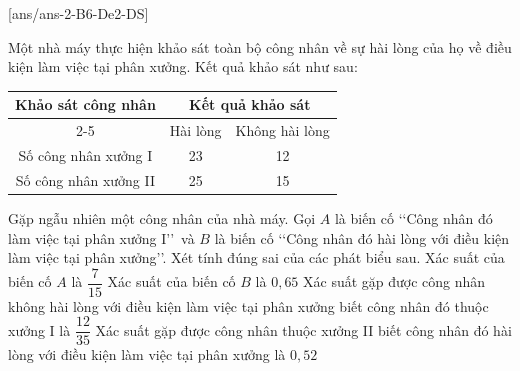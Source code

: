 \cauds
{}[ans/ans-2-B6-De2-DS]
\begin{ex}%
	Một nhà máy thực hiện khảo sát toàn bộ công nhân về sự hài lòng của họ về điều kiện làm việc tại phân xưởng. Kết quả khảo sát như sau:
	\begin{center}
		\begin{tabular}{|c|ccll|}
			\hline
			\multirow{2}{*}{Khảo sát công nhân} & \multicolumn{4}{c|}{Kết quả khảo sát}                               \\ \cline{2-5} 
			& \multicolumn{1}{c|}{Hài lòng} & \multicolumn{3}{c|}{Không hài lòng} \\ \hline
			Số công nhân xưởng I                & \multicolumn{1}{c|}{23}       & \multicolumn{3}{c|}{12}             \\ \hline
			Số công nhân xưởng II               & \multicolumn{1}{c|}{25}       & \multicolumn{3}{c|}{15}             \\ \hline
		\end{tabular}
	\end{center}
	Gặp ngẫu nhiên một công nhân của nhà máy. Gọi $A$ là biến cố \lq\lq Công nhân đó làm việc tại phân xưởng I\rq\rq \, và $B$ là biến cố \lq\lq Công nhân đó hài lòng với điều kiện làm việc tại phân xưởng\rq\rq. Xét tính đúng sai của các phát biểu sau.
	\choiceTF
	{\True Xác suất của biến cố $A$ là $\dfrac{7}{15}$}
	{Xác suất của biến cố $B$ là $0{,}65$}
	{\True Xác suất gặp được công nhân không hài lòng với điều kiện làm việc tại phân xưởng biết công nhân đó thuộc xưởng I là $\dfrac{12}{35}$}
	{Xác suất gặp được công nhân thuộc xưởng II biết công nhân đó hài lòng với điều kiện làm việc tại phân xưởng là $0{,}52$}
\end{ex}
